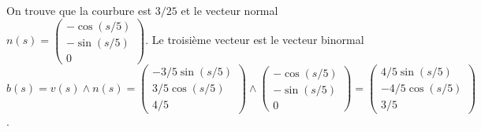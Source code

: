 {\begin{enumerate}
{ On trouve que la courbure est $3/25$ et le vecteur normal 
 $n(s)=\begin{pmatrix}-\cos (s/5)\\-\sin (s/5)\\0\end{pmatrix}$.
 Le troisième vecteur est le vecteur binormal
 $b(s)=v(s)\wedge n(s)=\begin{pmatrix}-3/5\sin (s/5)\\3/5\cos (s/5)\\4/5\end{pmatrix}
 \wedge\begin{pmatrix}-\cos (s/5)\\-\sin (s/5)\\0\end{pmatrix}
 =\begin{pmatrix} 4/5\sin (s/5)\\-4/5 \cos (s/5)\\ 3/5\end{pmatrix}$.}
\end{enumerate}
}
